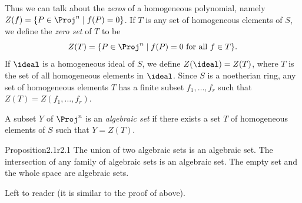 {Thus we can talk about the \emph{zeros} of a homogeneous polynomial, namely $Z(f)=\{P\in\Proj^n\mid f(P)=0\}$. If $T$ is any set of homogeneous elements of $S$, we define the \emph{zero set} of $T$ to be
\[
Z(T)=\{P\in\Proj^n\mid f(P)=0\text{ for all } f\in T\}.
\]
If $\ideal$ is a homogeneous ideal of $S$, we define $Z(\ideal)=Z(T)$, where $T$ is the set of all homogeneous elements in $\ideal$. Since $S$ is a noetherian ring, any set of homogeneous elements $T$ has a finite subset $f_1,\ldots,f_r$ such that $Z(T)=Z(f_1,\ldots,f_r)$.

\Dfn A subset $Y$ of $\Proj^n$ is an \emph{algebraic set} if there exists a set $T$ of homogeneous elements of $S$ such that $Y=Z(T)$.

\begin{result}{Proposition}{2.1}{r2.1}
The union of two algebraic sets is an algebraic set. The intersection of any family of algebraic sets is an algebraic set. The empty set and the whole space are algebraic sets.
\end{result}
\Proof Left to reader (it is similar to the proof of  above).
}

